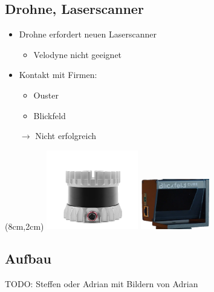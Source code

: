 \documentclass{beamer}
\begin{document}
\subsection{Drohne, Laserscanner}
\begin{frame}{\subsecname}
\begin{itemize}
\item{Drohne erfordert neuen Laserscanner}
\begin{itemize}
\item{Velodyne nicht geeignet}
\end{itemize}
\item{Kontakt mit Firmen:}
\begin{itemize}
\item{Ouster}
\item{Blickfeld}
\end{itemize}
\item[$\rightarrow$]{Nicht erfolgreich}
\end{itemize}
\begin{textblock*}{4cm}(8cm,2cm)
\centering
\includegraphics[width=4cm]{images/ouster.png}
\includegraphics[width=3cm]{images/blickfeld.png}
\end{textblock*}
\end{frame}

\subsection{Aufbau}
\begin{frame}{\subsecname}
TODO: Steffen oder Adrian mit Bildern von Adrian
\end{frame}
\end{document}
